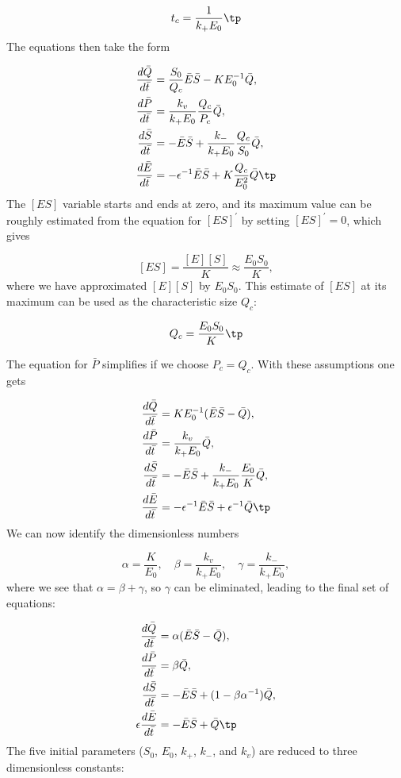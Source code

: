 \documentclass[graybox,envcountchap,sectrefs,final]{svmonodo}
\begin{document}
\[ t_c = \frac{1}{k_+E_0}\tp\]
The equations then take the form

\begin{align*}
\frac{d\bar Q}{d\bar t} &= \frac{S_0}{Q_c}\bar E\bar S
- KE_0^{-1}\bar Q,\\ 
\frac{d\bar P}{d\bar t} &= \frac{k_v}{k_+ E_0}\frac{Q_c}{P_c}\bar Q,\\ 
\frac{d\bar S}{d\bar t} &= -\bar E\bar S
+ \frac{k_-}{k_+E_0}\frac{Q_c}{S_0}\bar Q,\\ 
\frac{d\bar E}{d\bar t} &= -\epsilon^{-1}\bar E\bar S
+ K\frac{Q_c}{E_0^2}\bar Q\tp
\end{align*}
The $[ES]$ variable starts and ends at zero, and its maximum value
can be roughly estimated from the equation for $[ES]^\prime$
by setting $[ES]^\prime = 0$, which gives

\[ [ES] = \frac{[E][S]}{K}\approx \frac{E_0S_0}{K},\]
where we have approximated $[E][S]$ by $E_0S_0$. This estimate of $[ES]$
at its maximum can be used as the characteristic size $Q_c$:

\[ Q_c = \frac{E_0S_0}{K}\tp\]

The equation for $\bar P$ simplifies if we choose $P_c=Q_c$.
With these assumptions one gets

\begin{align*}
\frac{d\bar Q}{d\bar t} &= KE_0^{-1} (\bar E\bar S
- \bar Q),\\ 
\frac{d\bar P}{d\bar t} &= \frac{k_v}{k_+ E_0}\bar Q,\\ 
\frac{d\bar S}{d\bar t} &= -\bar E\bar S
+ \frac{k_-}{k_+E_0}\frac{E_0}{K}\bar Q,\\ 
\frac{d\bar E}{d\bar t} &= -\epsilon^{-1}\bar E\bar S
+ \epsilon^{-1}\bar Q\tp
\end{align*}
We can now identify the dimensionless numbers

\[ \alpha = \frac{K}{E_0},\quad \beta = \frac{k_v}{k_+ E_0},
\quad \gamma = \frac{k_-}{k_+E_0},
\]
where we see that $\alpha = \beta + \gamma$, so $\gamma$ can be eliminated,
leading to the final set of equations:

\begin{align}
\frac{d\bar Q}{d\bar t} &= \alpha (\bar E\bar S
- \bar Q),
\label{scale:MMK:Q2}\\ 
\frac{d\bar P}{d\bar t} &= \beta\bar Q,
\label{scale:MMK:P2}\\ 
\frac{d\bar S}{d\bar t} &= -\bar E\bar S
+ (1 - \beta\alpha^{-1})\bar Q,
\label{scale:MMK:S2}\\ 
\epsilon\frac{d\bar E}{d\bar t} &= -\bar E\bar S + \bar Q\tp
\label{scale:MMK:E2}
\end{align}
The five initial parameters ($S_0$, $E_0$, $k_+$, $k_-$, and $k_v$)
are reduced to three dimensionless constants:
\end{document}
